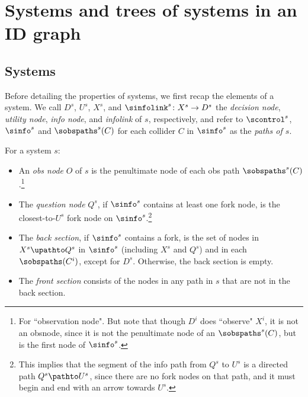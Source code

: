 








\section{Systems and trees of systems in an ID graph} \label{sec:preliminaries-systems-and-trees}


\subsection{Systems}

Before detailing the properties of systems, we first recap the elements of a system.
We call $D^s$, $U^s$, $X^s$, and $\sinfolink^s\colon X^s \to D^s$ the \emph{decision node}, \emph{utility node}, \emph{info node}, and \emph{infolink} of $s$, respectively, and refer to $\scontrol^s$, $\sinfo^s$ and $\sobspaths^s(C)$ for each collider $C$ in $\sinfo^s$ as the \emph{paths of $s$}.

\begin{definition} \label{def:back-&front-sections-of-system}
For a system $s$:
    \begin{itemize}
        \item An \emph{obs node} $O$ of $s$ is the penultimate node of each obs path $\sobspaths^s(C)$.\footnote{For ``observation node". But note that though $D^i$ does ``observe" $X^i$, it is not an obsnode, since it is not the penultimate node of an $\sobspaths^s(C)$, but is the first node of $\sinfo^s$.}

        \item The \emph{question node}  $Q^s$, if $\sinfo^s$ contains at least one fork node, is the closest-to-$U^s$ fork node on $\sinfo^s$.\footnote{This implies that the segment of the info path from $Q^s$ to $U^s$ is a directed path $Q^s\pathto U^s$, since there are no fork nodes on that path, and it must begin and end with an arrow towards $U^s$.}
        
        \item The \emph{back section}, if $\sinfo^s$ contains a fork, is the set of nodes in $X^s \upathto Q^s$ in $\sinfo^s$ 
        (including $X^s$ and $Q^s$)
        and in each $\sobspaths(C^i)$, except for $D^s$. Otherwise, the back section is empty.
        
        \item The \emph{front section} consists of the nodes in any path in $s$
        that are not in the back section.
    \end{itemize}
\end{definition}



